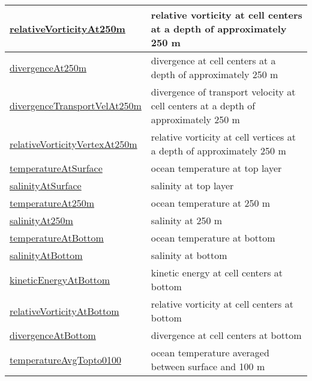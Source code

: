{\begin{center}
\begin{longtable}{| p{2.0in} | p{4.0in} |}
    \hline
    \hyperref[subsec:var_sec_highFrequencyOutputAM_relativeVorticityAt250m]{relativeVorticityAt250m} & relative vorticity at cell centers at a depth of approximately 250 m \\
    \hline
    \hyperref[subsec:var_sec_highFrequencyOutputAM_divergenceAt250m]{divergenceAt250m} & divergence at cell centers at a depth of approximately 250 m \\
    \hline
    \hyperref[subsec:var_sec_highFrequencyOutputAM_divergenceTransportVelAt250m]{divergenceTransportVelAt250m} & divergence of transport velocity at cell centers at a depth of approximately 250 m \\
    \hline
    \hyperref[subsec:var_sec_highFrequencyOutputAM_relativeVorticityVertexAt250m]{relativeVorticityVertexAt250m} & relative vorticity at cell vertices at a depth of approximately 250 m \\
    \hline
    \hyperref[subsec:var_sec_highFrequencyOutputAM_temperatureAtSurface]{temperatureAtSurface} & ocean temperature at top layer \\
    \hline
    \hyperref[subsec:var_sec_highFrequencyOutputAM_salinityAtSurface]{salinityAtSurface} & salinity at top layer \\
    \hline
    \hyperref[subsec:var_sec_highFrequencyOutputAM_temperatureAt250m]{temperatureAt250m} & ocean temperature at 250 m \\
    \hline
    \hyperref[subsec:var_sec_highFrequencyOutputAM_salinityAt250m]{salinityAt250m} & salinity at 250 m \\
    \hline
    \hyperref[subsec:var_sec_highFrequencyOutputAM_temperatureAtBottom]{temperatureAtBottom} & ocean temperature at bottom \\
    \hline
    \hyperref[subsec:var_sec_highFrequencyOutputAM_salinityAtBottom]{salinityAtBottom} & salinity at bottom \\
    \hline
    \hyperref[subsec:var_sec_highFrequencyOutputAM_kineticEnergyAtBottom]{kineticEnergyAtBottom} & kinetic energy at cell centers at bottom \\
    \hline
    \hyperref[subsec:var_sec_highFrequencyOutputAM_relativeVorticityAtBottom]{relativeVorticityAtBottom} & relative vorticity at cell centers at bottom \\
    \hline
    \hyperref[subsec:var_sec_highFrequencyOutputAM_divergenceAtBottom]{divergenceAtBottom} & divergence at cell centers at bottom \\
    \hline
    \hyperref[subsec:var_sec_highFrequencyOutputAM_temperatureAvgTopto0100]{temperatureAvgTopto0100} & ocean temperature averaged between surface and 100 m \\

\end{longtable}
\end{center}}
